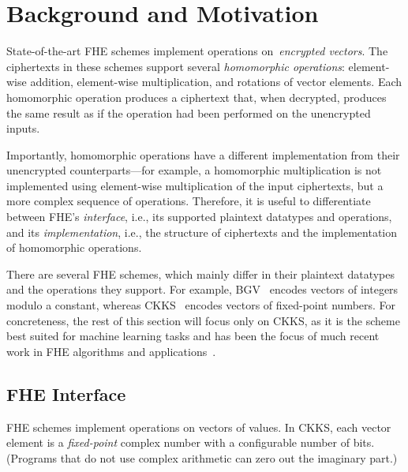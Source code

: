 \section{Background and Motivation}\label{sec:background}

\figBreakdown

State-of-the-art %
FHE schemes implement operations on~\emph{encrypted vectors}.
The ciphertexts in these schemes support several \emph{homomorphic operations}:
element-wise addition, element-wise multiplication,
and rotations of vector elements.
Each homomorphic operation produces a ciphertext that, when decrypted,
produces the same result as if the operation had been performed on the unencrypted inputs.

Importantly, homomorphic operations have a different implementation from their unencrypted counterparts---for example,
a homomorphic multiplication is not implemented using element-wise multiplication
of the input ciphertexts, but a more complex
sequence of operations. Therefore, it is useful to differentiate between FHE's \emph{interface},
i.e., its supported plaintext datatypes and operations,
and its \emph{implementation},
i.e., the structure of ciphertexts and the implementation of homomorphic operations.

There are several FHE schemes, which mainly differ in their plaintext datatypes and the operations they support.
For example, BGV~\cite{brakerski:toct14:bgv} encodes vectors of integers modulo a constant,
whereas CKKS~\cite{cheon:asiacrypt17:ckks} encodes vectors of fixed-point numbers.
For concreteness, the rest of this section will focus only on CKKS, as it
is the scheme best suited for machine learning tasks and has been the focus of
much recent work in FHE algorithms and applications~\cite{han:iacr18:efficient-logreg,lee2022privacy,gilad:icml16:cryptonets,podschwadt2020classification,dathathri:pldi19:chet,dathathri:pldi20:eva}.

\subsection{FHE Interface}

FHE schemes implement operations on vectors of values.
In CKKS, each vector element is a \emph{fixed-point} complex number with a configurable number of bits.
(Programs that do not use complex arithmetic can zero out the imaginary part.)

